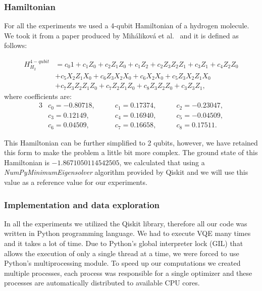 \subsubsection{Hamiltonian}
For all the experiments we used a 4-qubit Hamiltonian of a hydrogen molecule. We took it from a paper produced by Miháliková et al.~\cite{mihalikova} and it is defined as follows:

\begin{align*}H_{H_2}^{4-qubit} &= c_{0}1 + c_{1}Z_{0} + c_{2}Z_{1}Z_{0} + c_{1}Z_{2} + c_{2}Z_{3}Z_{2}Z_{1} + c_{3}Z_{1} + c_{4}Z_{2}Z_{0}\\
                                &+ c_{5}X_{2}Z_{1}X_{0} + c_{6}Z_{3}X_{2}X_{0} + c_{6}X_{2}X_{0} + c_{5}Z_{3}X_{2}Z_{1}X_{0}\\
                                &+c_{7}Z_{3}Z_{2}Z_{1}Z_{0} + c_{7}Z_{2}Z_{1}Z_{0} + c_{8}Z_{3}Z_{2}Z_{0} + c_{3}Z_{3}Z_{1},
\end{align*}
where coefficients are:
\begin{alignat*}{3}
    &c_0 = -0.80718,\qquad &c_1 = 0.17374,\qquad &c_2 =-0.23047, \\
    &c_3 = 0.12149,\qquad  &c_4 = 0.16940,\qquad &c_5 = -0.04509, \\
    &c_6 = 0.04509,\qquad  &c_7 = 0.16658,\qquad &c_8 = 0.17511.
\end{alignat*}

This Hamiltonian can be further simplified to 2 qubits, however, we have retained this form to make the problem a little bit more complex. The ground state of this Hamiltonian is $-1.8671050114542505$, we calculated that using a \textit{NumPyMinimumEigensolver} algorithm provided by Qiskit and we will use this value as a reference value for our experiments.

\subsubsection{Implementation and data exploration}
In all the experiments we utilized the Qiskit library, therefore all our code was written in Python programming language. We had to execute VQE many times and it takes a lot of time. Due to Python's global interpreter lock (GIL) that allows the execution of only a single thread at a time, we were forced to use Python's multiprocessing module. To speed up our computations we created multiple processes, each process was responsible for a single optimizer and these processes are automatically distributed to available CPU cores.

